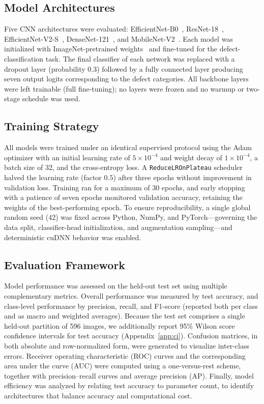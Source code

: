 \documentclass[ASNA, twocolumn]{USG}
\begin{document}
\subsection{Model Architectures}
Five CNN architectures were evaluated: EfficientNet-B0~\cite{ref27}, ResNet-18~\cite{ref24}, EfficientNet-V2-S~\cite{ref28}, DenseNet-121~\cite{ref25}, and MobileNet-V2~\cite{ref26}. Each model was initialized with ImageNet-pretrained weights~\cite{ref23} and fine-tuned for the defect-classification task. The final classifier of each network was replaced with a dropout layer (probability $0.3$) followed by a fully connected layer producing seven output logits corresponding to the defect categories. All backbone layers were left trainable (full fine-tuning); no layers were frozen and no warmup or two-stage schedule was used.

\subsection{Training Strategy}
All models were trained under an identical supervised protocol using the Adam optimizer with an initial learning rate of $5\times10^{-4}$ and weight decay of $1\times10^{-4}$, a batch size of 32, and the cross-entropy loss. A \texttt{ReduceLROnPlateau} scheduler halved the learning rate (factor $0.5$) after three epochs without improvement in validation loss. Training ran for a maximum of 30 epochs, and early stopping with a patience of seven epochs monitored validation accuracy, retaining the weights of the best-performing epoch. To ensure reproducibility, a single global random seed (42) was fixed across Python, NumPy, and PyTorch---governing the data split, classifier-head initialization, and augmentation sampling---and deterministic cuDNN behavior was enabled.

\subsection{Evaluation Framework}
Model performance was assessed on the held-out test set using multiple complementary metrics. Overall performance was measured by test accuracy, and class-level performance by precision, recall, and F1-score (reported both per class and as macro and weighted averages). Because the test set comprises a single held-out partition of 596 images, we additionally report 95\% Wilson score confidence intervals for test accuracy (Appendix~\ref{app:ci}). Confusion matrices, in both absolute and row-normalized form, were generated to visualize inter-class errors. Receiver operating characteristic (ROC) curves and the corresponding area under the curve (AUC) were computed using a one-versus-rest scheme, together with precision--recall curves and average precision (AP). Finally, model efficiency was analyzed by relating test accuracy to parameter count, to identify architectures that balance accuracy and computational cost.
\end{document}
